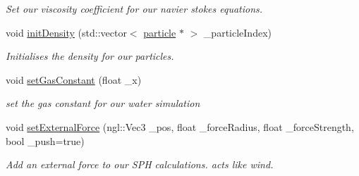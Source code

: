 \begin{DoxyCompactItemize}
\begin{DoxyCompactList}\small\item\em Set our viscosity coefficient for our navier stokes equations. \end{DoxyCompactList}\item 
void \hyperlink{classSPHSolver_aded0232e354909dfdb19ddc41e20bc7b}{init\-Density} (std\-::vector$<$ \hyperlink{classparticle}{particle} $\ast$ $>$ \-\_\-particle\-Index)
\begin{DoxyCompactList}\small\item\em Initialises the density for our particles. \end{DoxyCompactList}\item 
void \hyperlink{classSPHSolver_a62978b765c699c7e50a637ac17b8b64d}{set\-Gas\-Constant} (float \-\_\-x)
\begin{DoxyCompactList}\small\item\em set the gas constant for our water simulation \end{DoxyCompactList}\item 
void \hyperlink{classSPHSolver_ac1de32892a477c7474e06fc5bddfe24a}{set\-External\-Force} (ngl\-::\-Vec3 \-\_\-pos, float \-\_\-force\-Radius, float \-\_\-force\-Strength, bool \-\_\-push=true)
\begin{DoxyCompactList}\small\item\em Add an external force to our S\-P\-H calculations. acts like wind. \end{DoxyCompactList}\end{DoxyCompactItemize}
